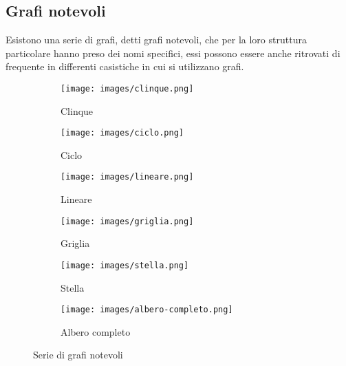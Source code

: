 \subsection{Grafi notevoli}
Esistono una serie di grafi, detti grafi notevoli, che per la loro struttura particolare hanno preso dei nomi specifici, essi possono essere anche ritrovati di frequente in differenti casistiche in cui si utilizzano grafi.
\begin{figure}[h!]
    \vspace{-10pt}
    \begin{subfigure}{.3\textwidth}
        \centering
        \texttt{[image: images/clinque.png]}
        \vspace{-5pt}
        \caption{Clinque}
    \end{subfigure}
    \hfill
    \begin{subfigure}{.3\textwidth}
        \centering
        \texttt{[image: images/ciclo.png]}
        \vspace{-5pt}
        \caption{Ciclo}
    \end{subfigure}
    \hfill
    \begin{subfigure}{.3\textwidth}
        \centering
        \texttt{[image: images/lineare.png]}
        \vspace{-5pt}
        \caption{Lineare}
    \end{subfigure}
    \hfill
    \begin{subfigure}{.3\textwidth}
        \centering
        \texttt{[image: images/griglia.png]}
        \vspace{-5pt}
        \caption{Griglia}
    \end{subfigure}
    \hfill
    \begin{subfigure}{.3\textwidth}
        \centering
        \texttt{[image: images/stella.png]}
        \vspace{-5pt}
        \caption{Stella}
    \end{subfigure}
    \hfill
    \begin{subfigure}{.3\textwidth}
        \centering
        \texttt{[image: images/albero-completo.png]}
        \vspace{-5pt}
        \caption{Albero completo}
    \end{subfigure}
    \vspace{5pt}
    \caption{Serie di grafi notevoli}
\end{figure}